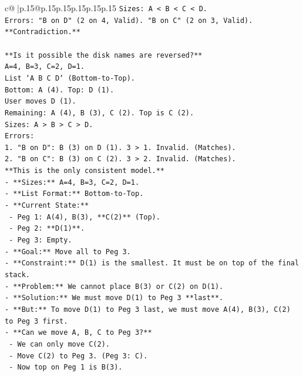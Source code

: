 \documentclass{article}
\begin{document}
{\begin{supertabular}{c@{$\;$}|p{.15\linewidth}@{}p{.15\linewidth}p{.15\linewidth}p{.15\linewidth}p{.15\linewidth}p{.15\linewidth}}
{{{\texttt{Sizes: A < B < C < D.} \\
\texttt{Errors: "B on D" (2 on 4, Valid). "B on C" (2 on 3, Valid).} \\
\texttt{**Contradiction.**} \\
\\ 
\texttt{**Is it possible the disk names are reversed?**} \\
\texttt{A=4, B=3, C=2, D=1.} \\
\texttt{List `A B C D` (Bottom{-}to{-}Top).} \\
\texttt{Bottom: A (4). Top: D (1).} \\
\texttt{User moves D (1).} \\
\texttt{Remaining: A (4), B (3), C (2). Top is C (2).} \\
\texttt{Sizes: A > B > C > D.} \\
\texttt{Errors:} \\
\texttt{1. "B on D": B (3) on D (1). 3 > 1. Invalid. (Matches).} \\
\texttt{2. "B on C": B (3) on C (2). 3 > 2. Invalid. (Matches).} \\
\texttt{**This is the only consistent model.**} \\
\texttt{{-} **Sizes:** A=4, B=3, C=2, D=1.} \\
\texttt{{-} **List Format:** Bottom{-}to{-}Top.} \\
\texttt{{-} **Current State:**} \\
\texttt{  {-} Peg 1: A(4), B(3), **C(2)** (Top).} \\
\texttt{  {-} Peg 2: **D(1)**.} \\
\texttt{  {-} Peg 3: Empty.} \\
\texttt{{-} **Goal:** Move all to Peg 3.} \\
\texttt{{-} **Constraint:** D(1) is the smallest. It must be on top of the final stack.} \\
\texttt{{-} **Problem:** We cannot place B(3) or C(2) on D(1).} \\
\texttt{{-} **Solution:** We must move D(1) to Peg 3 **last**.} \\
\texttt{{-} **But:** To move D(1) to Peg 3 last, we must move A(4), B(3), C(2) to Peg 3 first.} \\
\texttt{{-} **Can we move A, B, C to Peg 3?**} \\
\texttt{  {-} We can only move C(2).} \\
\texttt{  {-} Move C(2) to Peg 3. (Peg 3: C).} \\
\texttt{  {-} Now top on Peg 1 is B(3).} \\
}}}
\end{supertabular}}
\end{document}
